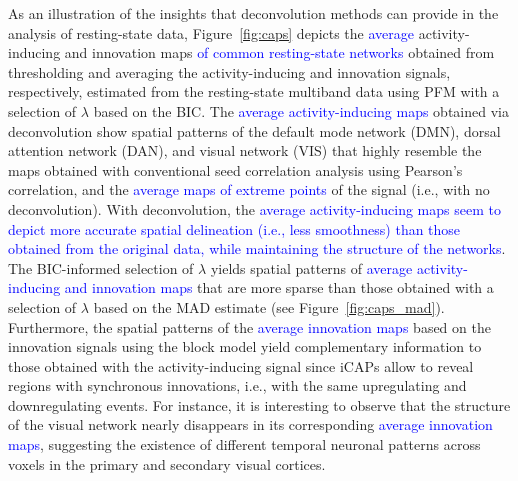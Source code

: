 As an illustration of the insights that deconvolution methods can provide in the
analysis of resting-state data, Figure~\ref{fig:caps} depicts the
\textcolor{blue}{average} activity-inducing and innovation maps
\textcolor{blue}{of common resting-state networks} obtained from thresholding
and averaging the activity-inducing and innovation signals, respectively,
estimated from the resting-state multiband data using PFM with a selection of
$\lambda$ based on the BIC. The \textcolor{blue}{average activity-inducing maps}
obtained via deconvolution show spatial patterns of the default mode network
(DMN), dorsal attention network (DAN), and visual network (VIS) that highly
resemble the maps obtained with conventional seed correlation analysis using
Pearson's correlation, and the \textcolor{blue}{average maps of extreme points}
of the signal (i.e., with no deconvolution). With deconvolution, the
\textcolor{blue}{average activity-inducing maps seem to depict more accurate
spatial delineation (i.e., less smoothness) than those obtained from the
original data, while maintaining the structure of the networks}. The
BIC-informed selection of $\lambda$ yields spatial patterns of
\textcolor{blue}{average activity-inducing and innovation maps} that are more
sparse than those obtained with a selection of $\lambda$ based on the MAD
estimate (see Figure~\ref{fig:caps_mad}). Furthermore, the spatial patterns of
the \textcolor{blue}{average innovation maps} based on the innovation signals
using the block model yield complementary information to those obtained with the
activity-inducing signal since iCAPs allow to reveal regions with synchronous
innovations, i.e., with the same upregulating and downregulating events. For
instance, it is interesting to observe that the structure of the visual network
nearly disappears in its corresponding \textcolor{blue}{average innovation
maps}, suggesting the existence of different temporal neuronal patterns across
voxels in the primary and secondary visual cortices.

